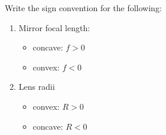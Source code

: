 

\vspace*{\fill}
\centering

Write the sign convention for the following:
\begin{enumerate}
    \item Mirror focal length:
   \begin{itemize}
      \item concave: $f > 0$
      \item convex: $f < 0$
   \end{itemize} 
    \item Lens radii
    \begin{itemize}
        \item convex: $R > 0$
        \item concave: $R < 0$
    \end{itemize}
\end{enumerate}

\centering
\vspace*{\fill}

